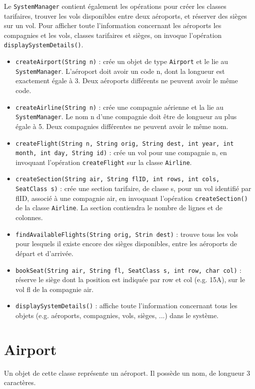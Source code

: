 \documentclass[a4paper,12pt,francais,twoside]{article}
\begin{document}
Le \texttt{SystemManager} contient également les opérations pour créer les
classes tarifaires, trouver les vols disponibles entre deux aéroports, et
réserver des sièges sur un vol. Pour afficher toute l'information concernant
les aéroports les compagnies et les vols, classes tarifaires et sièges, on 
invoque l'opération \texttt{displaySystemDetails()}.

\begin{itemize}
	\item \texttt{createAirport(String n)} : crée un objet de type \texttt{Airport}
	et le lie au \texttt{SystemManager}. L'aéroport doit avoir un code n, dont
	la longueur est exactement égale à 3. Deux aéroports différents ne peuvent avoir le même code.
	\item \texttt{createAirline(String n)} : crée une compagnie aérienne et la lie
	au \texttt{SystemManager}. Le nom n d'une compagnie doit être de longueur au plus
	égale à 5. Deux compagnies différentes ne peuvent avoir le même nom.
	\item \texttt{createFlight(String n, String orig, String dest, int year, int month, int day, String id)} : crée un vol pour une compagnie n, en invoquant l'opération \texttt{createFlight} sur
	la classe \texttt{Airline}.
	\item \texttt{createSection(String air, String flID, int rows, int cols, SeatClass s)} : crée
	une section tarifaire, de classe s, pour un vol identifié par flID, associé à une compagnie
	air, en invoquant l'opération \texttt{createSection()} de la classe \texttt{Airline}.
	La section contiendra le nombre de lignes et de colonnes.
	\item \texttt{findAvailableFlights(String orig, Strin dest)} : trouve tous les vols
	pour lesquels il existe encore des sièges disponibles, entre les aéroports
	de départ et d'arrivée.
	\item \texttt{bookSeat(String air, String fl, SeatClass s, int row, char col)} : 
	réserve le siège dont la position est indiquée par row et col (e.g. 15A), sur le
	vol fl de la compagnie air.
	\item \texttt{displaySystemDetails()} : affiche toute l'information concernant
	tous les objets (e.g. aéroports, compagnies, vols, sièges, ...) dans le système.
\end{itemize}


\section{Airport}
Un objet de cette classe représente un aéroport. Il possède un nom, de longueur 3 caractères.
\end{document}
